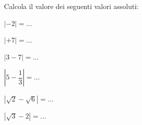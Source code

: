 \subsubsection*{}

\begin{esercizio}\label{ese:03.1}
Calcola il valore dei seguenti valori assoluti:
\begin{multicols}{3}
\begin{enumeratea}
\item $|-2|=\dots$
\item $|+7|=\dots$
\item $|3-7|=\dots$
\item $|5-\dfrac{1}{3}|=\dots$
\item $|\sqrt{2}-\sqrt{6}|=\dots$
\item $|\sqrt{3}-2|=\dots$
\end{enumeratea}
\end{multicols}
\end{esercizio}

